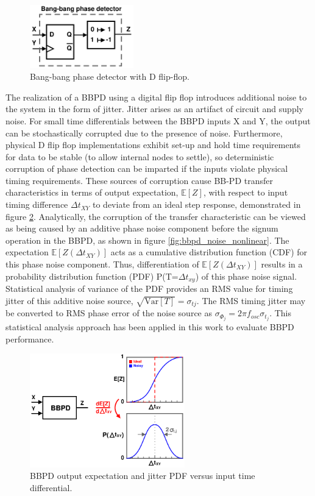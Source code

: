 		\begin{figure}[htb!]
			\center\includegraphics[width=0.4\textwidth, angle=0]{./figs/design/bbpd_}
			\caption{Bang-bang phase detector with D flip-flop.}
			\label{fig:bbpd_dff}
		\end{figure}
		The realization of a BBPD using a digital flip flop introduces additional noise to the system in the form of jitter. Jitter arises as an artifact of circuit and supply noise. For small time differentials between the BBPD inputs X and Y, the output can be stochastically corrupted due to the presence of noise. Furthermore, physical D flip flop implementations exhibit set-up and hold time requirements for data to be stable (to allow internal nodes to settle), so deterministic corruption of phase detection can be imparted if the inputs violate physical timing requirements. These sources of corruption cause BB-PD transfer characteristics in terms of output expectation, $\mathbb{E}[Z]$, with respect to input timing difference $\Delta t_{XY}$ to deviate from an ideal step response, demonstrated in figure \ref{fig:bbpd_jit_pdf}. Analytically, the corruption of the transfer characteristic can be viewed as being caused by an additive phase noise component before the signum operation in the BBPD, as shown in figure \ref{fig:bbpd_noise_nonlinear}. The expectation $\mathbb{E}[Z(\Delta t_{XY})]$ acts as a cumulative distribution function (CDF) for this phase noise component. Thus, differentiation of $\mathbb{E}[Z(\Delta t_{XY})]$ results in a probability distribution function (PDF) P(T=$\Delta t_{xy}$) of this phase noise signal. Statistical analysis of variance of the PDF provides an RMS value for timing jitter of this additive noise source, $\sqrt{\mathrm{Var}[T]} = \sigma_{tj}$. The RMS timing jitter may be converted to RMS phase error of the noise source as $\sigma_{\Phi_j} = 2\pi f_{osc}\sigma_{t_j}$. This statistical analysis approach has been applied in this work to evaluate BBPD performance.
 
		\begin{figure}[htb!]
		    \centering
			\includegraphics[width=0.6\textwidth, angle=0]{./figs/bbpd_jitter.pdf}
			\caption{BBPD output expectation and jitter PDF versus input time differential.}
			\label{fig:bbpd_jit_pdf}
		\end{figure}


